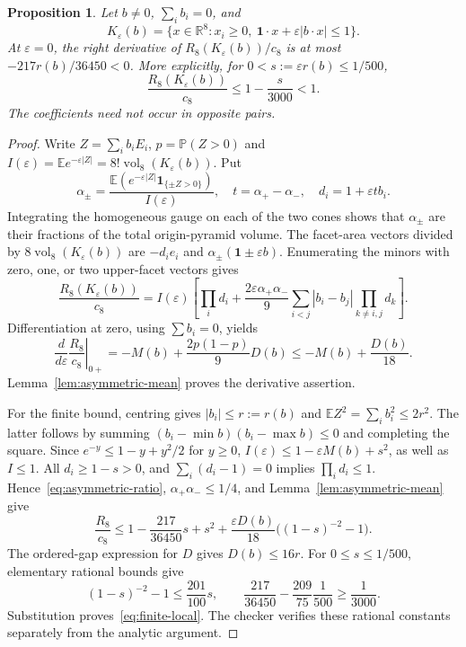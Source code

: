 \documentclass[11pt,a4paper]{article}
\newcommand{\vol}{\operatorname{vol}}
\newcommand{\E}{\mathbb E}
\newcommand{\PP}{\mathbb P}
\newtheorem{proposition}{Proposition}
\begin{document}
\begin{proposition}\label{prop:local-asymmetric}
Let $b\ne0$, $\sum_i b_i=0$, and
\[
 K_\varepsilon(b)=\{x\in\mathbb R^8:x_i\ge0,\
                 \boldsymbol1\cdot x+\varepsilon|b\cdot x|\le1\}.
\]
At $\varepsilon=0$, the right derivative of $R_8(K_\varepsilon(b))/c_8$
is at most $-217r(b)/36450<0$. More explicitly, for
$0<s:=\varepsilon r(b)\le1/500$,
\begin{equation}\label{eq:finite-local}
 \frac{R_8(K_\varepsilon(b))}{c_8}\le1-\frac{s}{3000}<1.
\end{equation}
The coefficients need not occur in opposite pairs.
\end{proposition}
\begin{proof}
Write $Z=\sum_i b_iE_i$, $p=\PP(Z>0)$ and
$I(\varepsilon)=\E e^{-\varepsilon|Z|}=8!\vol_8(K_\varepsilon(b))$.
Put
\[
 \alpha_\pm=\frac{\E(e^{-\varepsilon|Z|}\boldsymbol1_{\{\pm Z>0\}})}{I(\varepsilon)},
 \quad t=\alpha_+-\alpha_-,\quad d_i=1+\varepsilon t b_i.
\]
Integrating the homogeneous gauge on each of the two cones shows that
$\alpha_\pm$ are their fractions of the total origin-pyramid volume.
The facet-area vectors divided by $8\vol_8(K_\varepsilon(b))$ are
$-d_ie_i$ and $\alpha_\pm(\boldsymbol1\pm\varepsilon b)$.
Enumerating the minors with zero, one, or two upper-facet vectors gives
\begin{equation}\label{eq:asymmetric-ratio}
 \frac{R_8(K_\varepsilon(b))}{c_8}
 =I(\varepsilon)\left[
 \prod_i d_i+\frac{2\varepsilon\alpha_+\alpha_-}{9}
 \sum_{i<j}|b_i-b_j|\prod_{k\ne i,j}d_k\right].
\end{equation}
Differentiation at zero, using $\sum b_i=0$, yields
\[
 \left.\frac{d}{d\varepsilon}\frac{R_8}{c_8}\right|_{0+}
 =-M(b)+\frac{2p(1-p)}9D(b)
 \le-M(b)+\frac{D(b)}{18}.
\]
Lemma~\ref{lem:asymmetric-mean} proves the derivative assertion.

For the finite bound, centring gives $|b_i|\le r:=r(b)$ and
$\E Z^2=\sum_i b_i^2\le2r^2$. The latter follows by summing
$(b_i-\min b)(b_i-\max b)\le0$ and completing the square.
Since $e^{-y}\le1-y+y^2/2$ for $y\ge0$,
$I(\varepsilon)\le1-\varepsilon M(b)+s^2$, as well as $I\le1$.
All $d_i\ge1-s>0$, and $\sum_i(d_i-1)=0$ implies $\prod_i d_i\le1$.
Hence~\eqref{eq:asymmetric-ratio}, $\alpha_+\alpha_-\le1/4$, and
Lemma~\ref{lem:asymmetric-mean} give
\[
 \frac{R_8}{c_8}\le1-\frac{217}{36450}s+s^2
       +\frac{\varepsilon D(b)}{18}\big((1-s)^{-2}-1\big).
\]
The ordered-gap expression for $D$ gives $D(b)\le16r$. For
$0\le s\le1/500$, elementary rational bounds give
\[
 (1-s)^{-2}-1\le\frac{201}{100}s,\qquad
 \frac{217}{36450}-\frac{209}{75}\frac1{500}\ge\frac1{3000}.
\]
Substitution proves~\eqref{eq:finite-local}. The checker verifies these
rational constants separately from the analytic argument.
\end{proof}
\end{document}
